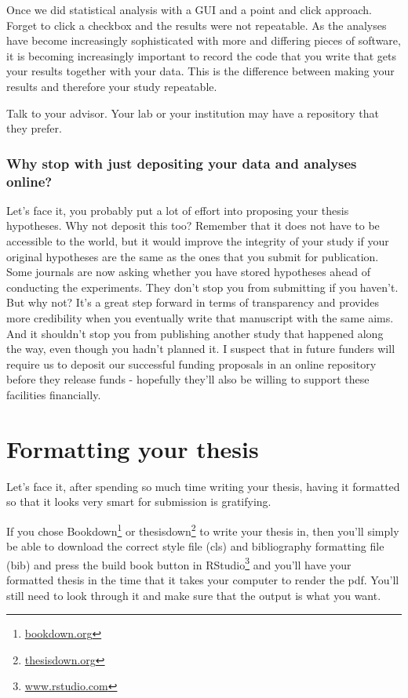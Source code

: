 \documentclass[
]{krantz}
\renewcommand{\href}[2]{#2\footnote{\url{#1}}}
\begin{document}
Once we did statistical analysis with a GUI and a point and click approach. Forget to click a checkbox and the results were not repeatable. As the analyses have become increasingly sophisticated with more and differing pieces of software, it is becoming increasingly important to record the code that you write that gets your results together with your data. This is the difference between making your results and therefore your study repeatable.

Talk to your advisor. Your lab or your institution may have a repository that they prefer.

\hypertarget{why-stop-with-just-depositing-your-data-and-analyses-online}{%
\subsection{Why stop with just depositing your data and analyses online?}\label{why-stop-with-just-depositing-your-data-and-analyses-online}}

Let's face it, you probably put a lot of effort into proposing your thesis hypotheses. Why not deposit this too? Remember that it does not have to be accessible to the world, but it would improve the integrity of your study if your original hypotheses are the same as the ones that you submit for publication. Some journals are now asking whether you have stored hypotheses ahead of conducting the experiments. They don't stop you from submitting if you haven't. But why not? It's a great step forward in terms of transparency and provides more credibility when you eventually write that manuscript with the same aims. And it shouldn't stop you from publishing another study that happened along the way, even though you hadn't planned it. I suspect that in future funders will require us to deposit our successful funding proposals in an online repository before they release funds - hopefully they'll also be willing to support these facilities financially.

\hypertarget{formatting}{%
\chapter{Formatting your thesis}\label{formatting}}

Let's face it, after spending so much time writing your thesis, having it formatted so that it looks very smart for submission is gratifying.

If you chose \href{bookdown.org}{Bookdown} or \href{thesisdown.org}{thesisdown} to write your thesis in, then you'll simply be able to download the correct style file (cls) and bibliography formatting file (bib) and press the build book button in \href{www.rstudio.com}{RStudio} and you'll have your formatted thesis in the time that it takes your computer to render the pdf. You'll still need to look through it and make sure that the output is what you want.
\end{document}
